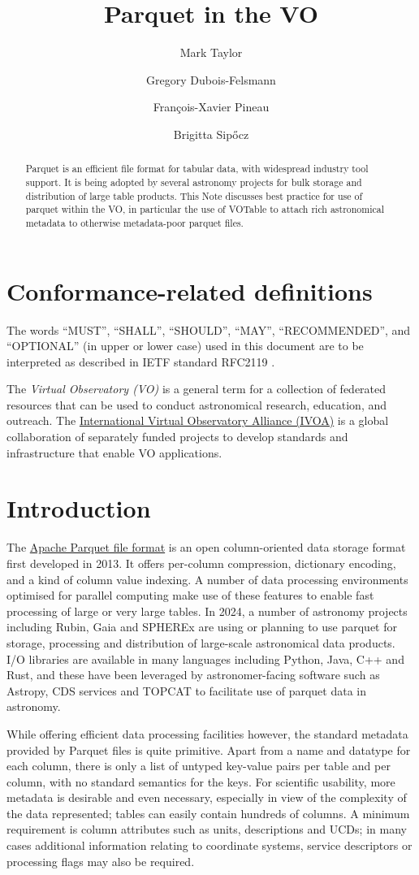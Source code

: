 \documentclass[11pt,a4paper]{ivoa}
\title{Parquet in the VO}
\author[https://wiki.ivoa.net/twiki/bin/view/IVOA/MarkTaylor]
       {Mark Taylor}
\author[https://wiki.ivoa.net/twiki/bin/view/IVOA/GregoryDuboisFelsmann]
       {Gregory Dubois-Felsmann}
\author[https://wiki.ivoa.net/twiki/bin/view/IVOA/FrancoisXavierPineau]
       {Fran\c{c}ois-Xavier Pineau}
\author{Brigitta Sip\H{o}cz}
\begin{document}
\begin{abstract}
Parquet is an efficient file format for tabular data,
with widespread industry tool support.
It is being adopted by several astronomy projects for bulk storage and
distribution of large table products.
This Note discusses best practice for use of parquet within the VO,
in particular the use of VOTable to attach rich astronomical metadata
to otherwise metadata-poor parquet files.
\end{abstract}

\section*{Conformance-related definitions}

The words ``MUST'', ``SHALL'', ``SHOULD'', ``MAY'', ``RECOMMENDED'', and
``OPTIONAL'' (in upper or lower case) used in this document are to be
interpreted as described in IETF standard RFC2119 \citep{std:RFC2119}.

The \emph{Virtual Observatory (VO)} is a
general term for a collection of federated resources that can be used
to conduct astronomical research, education, and outreach.
The \href{https://www.ivoa.net}{International
Virtual Observatory Alliance (IVOA)} is a global
collaboration of separately funded projects to develop standards and
infrastructure that enable VO applications.


\section{Introduction}

The \href{https://parquet.apache.org/docs/}{Apache Parquet file format}
is an open column-oriented data storage
format first developed in 2013.
It offers per-column compression, dictionary encoding, and
a kind of column value indexing.
A number of data processing environments optimised for parallel
computing make use of these features to enable fast processing
of large or very large tables.
In 2024, a number of astronomy projects including Rubin, Gaia and SPHEREx
are using or planning to use parquet for storage, processing
and distribution of large-scale astronomical data products.
I/O libraries are available in many languages including Python,
Java, C++ and Rust, and these have been leveraged by astronomer-facing
software such as Astropy, CDS services and TOPCAT to facilitate
use of parquet data in astronomy.

While offering efficient data processing facilities however,
the standard metadata provided by Parquet files is quite primitive.
Apart from a name and datatype for each column,
there is only a list of untyped key-value pairs per table
and per column, with no standard semantics for the keys.
For scientific usability, more metadata is desirable and even necessary,
especially in view of the complexity of the data represented;
tables can easily contain hundreds of columns.
A minimum requirement is column attributes such as units, descriptions
and UCDs; in many cases additional information relating to
coordinate systems, service descriptors or processing flags
may also be required.
\end{document}
